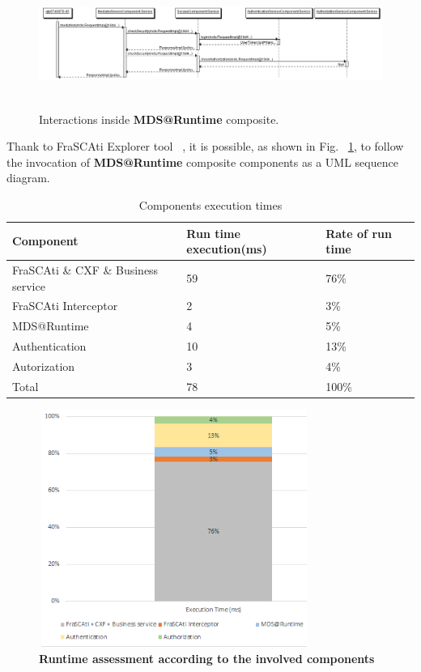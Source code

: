 \documentclass[runningheads,a4paper]{llncs}
\begin{document}
\begin{figure}  
\center
\includegraphics[height=120pt,width=380pt]{uml.png}
\caption{Interactions inside  \textbf{MDS@Runtime} composite.}
\label{fig:sequence}
\end{figure}


Thank to FraSCAti Explorer tool ~\cite{SMF09}, it is possible, as shown in Fig. ~\ref{fig:sequence}, to follow the invocation of  \textbf{MDS@Runtime} composite components as a UML sequence diagram.


\begin{table}

\caption{Components execution times}
\begin{tabular}{@{}*{3}{|p{3.1cm}}|@{} }
\hline
Component & Run time execution(ms)   & Rate of run time \\[0.2cm]
  \hline
  FraSCAti \& CXF \& Business service & 59&  76\%\\
 FraSCAti Interceptor & 2&  3\%\\ 
 MDS@Runtime & 4&  5\%\\
 Authentication& 10& 13\%\\
 Autorization & 3& 4\%\\
 \hline
   Total & 78& 100\%\\
    \hline

\end{tabular}
\end{table}

\begin{figure}[ht]  
\centering
\includegraphics[height=220pt, width=250pt]{runtimeAssessment1.PNG}
\caption{\textbf{Runtime assessment according to the involved components
}}
\label{fig:RuntimeAssess}
\end{figure}
\end{document}
